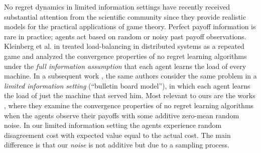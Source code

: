 No regret dynamics in limited information settings have recently received
substantial attention from the scientific community since they provide
realistic models for the practical applications of game theory.  Perfect payoff
information is rare in practice; agents act based on random or noisy past
payoff observations.  Kleinberg et al. in \cite{KPT09} treated load-balancing
in distributed systems as a repeated game and analyzed the convergence
properties of no regret learning algorithms under the \emph{full information
  assumption} that each agent learns the load of every machine.  In a
subsequent work \cite{KPT11}, the same authors consider the same problem in a
\emph{limited information setting} (\enquote{bulletin board model}), in which
each agent learns the load of just the machine that served him. Most relevant
to ours are the works \cite{HCM17,MS17,BM17,CHM17}, where they examine the
convergence properties of no regret learning algorithms when the agents observe
their payoffs with some additive zero-mean random noise. In our limited
information setting the agents experience random disagreement cost with
expected value equal to the actual cost.  The main difference is that our
\emph{noise} is not additive but due to a sampling process.
